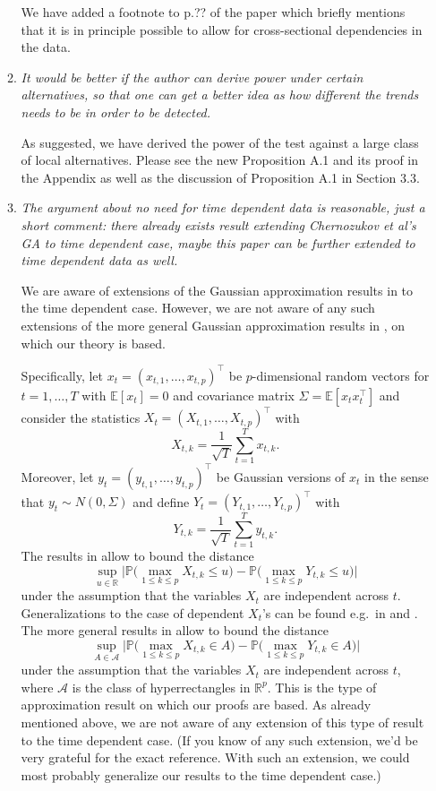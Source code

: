 \documentclass[a4paper,12pt]{article}
\begin{document}
\begin{enumerate}[label=(\arabic*),leftmargin=0.7cm]
\begin{enumerate}[label=(\alph*),leftmargin=0.7cm]
We have added a footnote to p.?? of the paper which briefly mentions that it is in principle possible to allow for cross-sectional dependencies in the data.

\item \textit{It would be better if the author can derive power under certain alternatives, so that one can get a better idea as how different the trends needs to be in order to be detected.}

As suggested, we have derived the power of the test against a large class of local alternatives. Please see the new Proposition A.1 and its proof in the Appendix as well as the discussion of Proposition A.1 in Section 3.3.

\item \textit{The argument about no need for time dependent data is reasonable, just a short comment: there already exists result extending Chernozukov et al's GA to time dependent case, maybe this paper can be further extended to time dependent data as well.}

We are aware of extensions of the Gaussian approximation results in \cite{Chernozhukov2013} to the time dependent case. However, we are not aware of any such extensions of the more general Gaussian approximation results in \cite{Chernozhukov2017}, on which our theory is based. 

Specifically, let $x_t = (x_{t,1},\ldots,x_{t,p})^\top$ be $p$-dimensional random vectors for $t=1,\ldots,T$ with $\mathbb{E}[x_t] = 0$ and covariance matrix $\Sigma = \mathbb{E}[x_t x_t^\top]$ and consider the statistics $X_t = (X_{t,1},\ldots,X_{t,p})^\top$ with
\[ X_{t,k} = \frac{1}{\sqrt{T}} \sum_{t=1}^T x_{t,k}. \]
Moreover, let $y_t = (y_{t,1},\ldots,y_{t,p})^\top$ be Gaussian versions of $x_t$ in the sense that $y_t \sim N(0,\Sigma)$ and define $Y_t = (Y_{t,1},\ldots,Y_{t,p})^\top$ with
\[ Y_{t,k} = \frac{1}{\sqrt{T}} \sum_{t=1}^T y_{t,k}. \]
The results in \cite{Chernozhukov2013} allow to bound the distance
\[ \sup_{u \in \mathbb{R}} \Big| \mathbb{P} \big( \max_{1 \le k \le p} X_{t,k} \le u \big) - \mathbb{P} \big( \max_{1 \le k \le p} Y_{t,k} \le u \big) \Big| \]
under the assumption that the variables $X_t$ are independent across $t$. Generalizations to the case of dependent $X_t$'s can be found e.g.\ in \cite{ZhangWu2017} and \cite{ZhangCheng2018}. The more general results in \cite{Chernozhukov2017} allow to bound the distance 
\[ \sup_{A \in \mathcal{A}} \Big| \mathbb{P} \big( \max_{1 \le k \le p} X_{t,k} \in A \big) - \mathbb{P} \big( \max_{1 \le k \le p} Y_{t,k} \in A \big) \Big| \]
under the assumption that the variables $X_t$ are independent across $t$, where $\mathcal{A}$ is the class of hyperrectangles in $\mathbb{R}^p$. This is the type of approximation result on which our proofs are based. As already mentioned above, we are not aware of any extension of this type of result to the time dependent case. (If you know of any such extension, we'd be very grateful for the exact reference. With such an extension, we could most probably generalize our results to the time dependent case.) 


\end{enumerate}
\end{enumerate}
\end{document}
